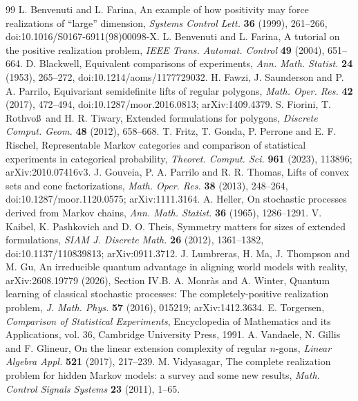\begin{thebibliography}{99}
 L. Benvenuti and L. Farina,
An example of how positivity may force realizations of ``large'' dimension,
\emph{Systems Control Lett.} \textbf{36} (1999), 261--266,
doi:10.1016/S0167-6911(98)00098-X.
 L. Benvenuti and L. Farina,
A tutorial on the positive realization problem,
\emph{IEEE Trans. Automat. Control} \textbf{49} (2004), 651--664.
 D. Blackwell,
Equivalent comparisons of experiments,
\emph{Ann. Math. Statist.} \textbf{24} (1953), 265--272,
doi:10.1214/aoms/1177729032.
 H. Fawzi, J. Saunderson and P. A. Parrilo,
Equivariant semidefinite lifts of regular polygons,
\emph{Math. Oper. Res.} \textbf{42} (2017), 472--494,
doi:10.1287/moor.2016.0813; arXiv:1409.4379.
 S. Fiorini, T. Rothvo\ss\ and H. R. Tiwary,
Extended formulations for polygons,
\emph{Discrete Comput. Geom.} \textbf{48} (2012), 658--668.
 T. Fritz, T. Gonda, P. Perrone and E. F. Rischel,
Representable Markov categories and comparison of statistical experiments
in categorical probability,
\emph{Theoret. Comput. Sci.} \textbf{961} (2023), 113896;
arXiv:2010.07416v3.
 J. Gouveia, P. A. Parrilo and R. R. Thomas,
Lifts of convex sets and cone factorizations,
\emph{Math. Oper. Res.} \textbf{38} (2013), 248--264,
doi:10.1287/moor.1120.0575; arXiv:1111.3164.
 A. Heller,
On stochastic processes derived from Markov chains,
\emph{Ann. Math. Statist.} \textbf{36} (1965), 1286--1291.
 V. Kaibel, K. Pashkovich and D. O. Theis,
Symmetry matters for sizes of extended formulations,
\emph{SIAM J. Discrete Math.} \textbf{26} (2012), 1361--1382,
doi:10.1137/110839813; arXiv:0911.3712.
 J. Lumbreras, H. Ma, J. Thompson and M. Gu,
An irreducible quantum advantage in aligning world models with reality,
arXiv:2608.19779 (2026), Section IV.B.
 A. Monr\`as and A. Winter,
Quantum learning of classical stochastic processes:
The completely-positive realization problem,
\emph{J. Math. Phys.} \textbf{57} (2016), 015219;
arXiv:1412.3634.
 E. Torgersen,
\emph{Comparison of Statistical Experiments}, Encyclopedia of Mathematics
and its Applications, vol. 36, Cambridge University Press, 1991.
 A. Vandaele, N. Gillis and F. Glineur,
On the linear extension complexity of regular $n$-gons,
\emph{Linear Algebra Appl.} \textbf{521} (2017), 217--239.
 M. Vidyasagar,
The complete realization problem for hidden Markov models: a survey
and some new results,
\emph{Math. Control Signals Systems} \textbf{23} (2011), 1--65.

\end{thebibliography}
